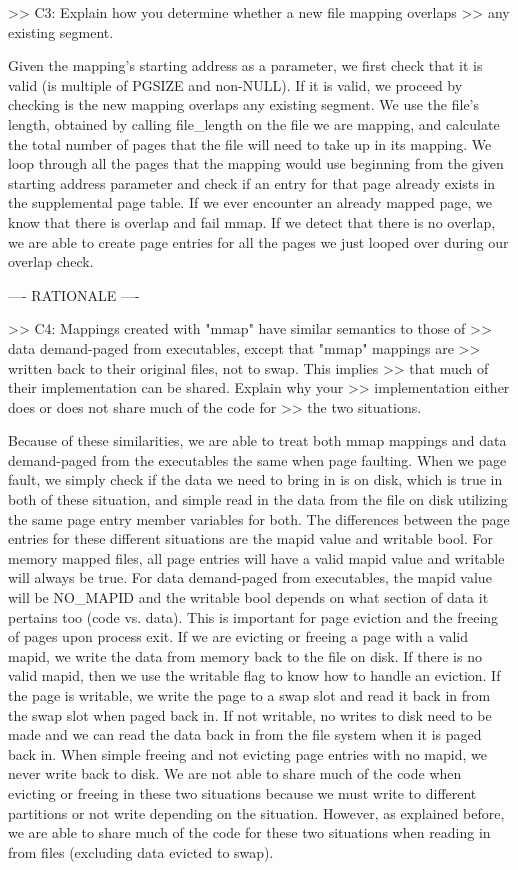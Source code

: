 >> C3: Explain how you determine whether a new file mapping overlaps
>> any existing segment.

Given the mapping's starting address as a parameter, we first check that it
is valid (is multiple of PGSIZE and non-NULL). If it is valid, we proceed by
checking is the new mapping overlaps any existing segment. We use the file's 
length, obtained by calling file_length on the file we are mapping, and
calculate the total number of pages that the file will need to take up in its 
mapping. We loop through all the pages that the mapping would use beginning
from the given starting address parameter and check if
an entry for that page already exists in the supplemental page table. If we
ever encounter an already mapped page, we know that there is overlap and
fail mmap. If we detect that there is no overlap, we are able to create page
entries for all the pages we just looped over during our overlap check.

---- RATIONALE ----

>> C4: Mappings created with "mmap" have similar semantics to those of
>> data demand-paged from executables, except that "mmap" mappings are
>> written back to their original files, not to swap.  This implies
>> that much of their implementation can be shared.  Explain why your
>> implementation either does or does not share much of the code for
>> the two situations.

Because of these similarities, we are able to treat both mmap mappings
and data demand-paged from the executables the same when page faulting.
When we page fault, we simply check if the data we need to bring in is
on disk, which is true in both of these situation, and simple read in
the data from the file on disk utilizing the same page entry member
variables for both. The differences between the page entries for
these different situations are the mapid value and writable bool. For 
memory mapped files, all page entries will have a valid mapid value and
writable will always be true. For data demand-paged from executables, 
the mapid value will be NO_MAPID and the writable bool depends on what
section of data it pertains too (code vs. data). This is important for
page eviction and the freeing of pages upon process exit. If we are 
evicting or freeing a page with a valid mapid, we write the data from
memory back to the file on disk. If there is no valid mapid, then we 
use the writable flag to know how to handle an eviction. If the page is
writable, we write the page to a swap slot and read it back in from the
swap slot when paged back in. If not writable, no writes to disk need to be
made and we can read the data back in from the file system when it is paged
back in. When simple freeing and not evicting page entries with no mapid,
we never write back to disk. We are not able to share much of the code
when evicting or freeing in these two situations because we must write to
different partitions or not write depending on the situation. However,
as explained before, we are able to share much of the code for these two
situations when reading in from files (excluding data evicted to swap).

